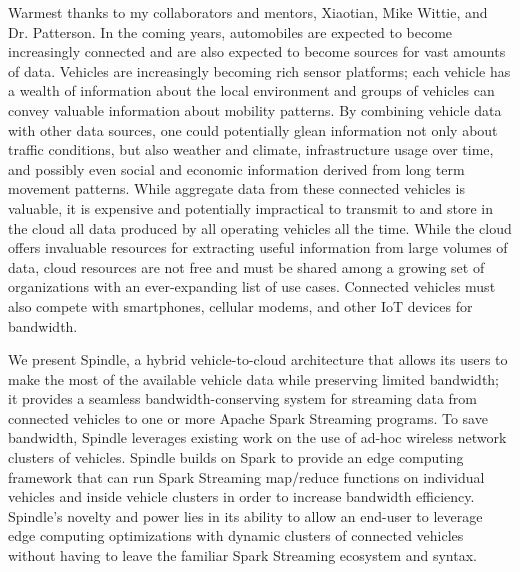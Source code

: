 \documentclass{thesis}
\author{William Rory Kronmiller}
\begin{document}
 
\titlepage             %
\tableofcontents       %
\listoftables          %
\listoffigures         %


    Warmest thanks to my collaborators and mentors, Xiaotian, Mike Wittie, and Dr. Patterson.
    In the coming years, automobiles are expected to become increasingly connected and are
    also expected to become sources for vast amounts of data. Vehicles are increasingly 
    becoming rich sensor platforms; each vehicle has a wealth of information about the local
    environment and groups of vehicles can convey valuable information about mobility patterns.
    By combining vehicle data with other data sources, one could potentially glean information
    not only about traffic conditions, but also weather and climate, infrastructure usage over
    time, and possibly even social and economic information derived from long term movement
    patterns. While aggregate data from these connected vehicles is valuable, it is expensive
    and potentially impractical to transmit to and store in the cloud all data produced by 
    all operating vehicles all the time. While the cloud offers invaluable resources for
    extracting useful information from large volumes of data, cloud resources are not 
    free and must be shared among a growing set of organizations with an ever-expanding
    list of use cases. Connected vehicles must also compete with smartphones, cellular
    modems, and other IoT devices for bandwidth.
    
    We present Spindle, a hybrid vehicle-to-cloud architecture that allows its users to make
    the most of the available vehicle data while preserving limited bandwidth; it provides a 
    seamless bandwidth-conserving system for streaming data from connected vehicles to one 
    or more Apache Spark Streaming programs. To save bandwidth, Spindle leverages existing 
    work on the use of ad-hoc wireless network clusters of vehicles. Spindle builds on Spark
    to provide an edge computing framework that can run Spark Streaming  map/reduce functions on
    individual vehicles and inside vehicle clusters in order to increase bandwidth efficiency.
    Spindle's novelty and power lies in its ability to allow an end-user to leverage edge
    computing optimizations with dynamic clusters of connected vehicles without having to
    leave the familiar Spark Streaming ecosystem and syntax.
\end{document}

